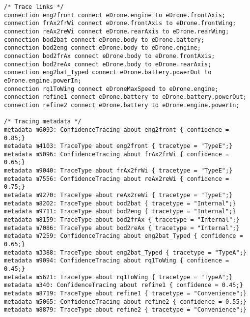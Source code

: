 \begin{center}
\begin{lstlisting}[caption={SysML code generated from a Tracea model.},
label=lst:sysmlout,
style=mystylesysml,
frame=shadowbox,
rulesepcolor=\color{blue},
linewidth=16.6cm,
xleftmargin=0.2cm,
morekeywords={connection,connect,to,metadata,about}]
/* Trace links */
connection eng2front connect eDrone.engine to eDrone.frontAxis;
connection frAx2frWi connect eDrone.frontAxis to eDrone.frontWing;
connection reAx2reWi connect eDrone.rearAxis to eDrone.rearWing;
connection bod2bat connect eDrone.body to eDrone.battery;
connection bod2eng connect eDrone.body to eDrone.engine;
connection bod2frAx connect eDrone.body to eDrone.frontAxis;
connection bod2reAx connect eDrone.body to eDrone.rearAxis;
connection eng2bat_Typed connect eDrone.battery.powerOut to eDrone.engine.powerIn;
connection rq1ToWing connect eDroneMaxSpeed to eDrone.engine;
connection refine1 connect eDrone.battery to eDrone.battery.powerOut;
connection refine2 connect eDrone.battery to eDrone.engine.powerIn;

/* Tracing metadata */
metadata m6093: ConfidenceTracing about eng2front { confidence = 0.85;}
metadata m4103: TraceType about eng2front { tracetype = "TypeE";}
metadata m5096: ConfidenceTracing about frAx2frWi { confidence = 0.65;}
metadata m9040: TraceType about frAx2frWi { tracetype = "TypeE";}
metadata m7556: ConfidenceTracing about reAx2reWi { confidence = 0.75;}
metadata m9270: TraceType about reAx2reWi { tracetype = "TypeE";}
metadata m8202: TraceType about bod2bat { tracetype = "Internal";}
metadata m9711: TraceType about bod2eng { tracetype = "Internal";}
metadata m8159: TraceType about bod2frAx { tracetype = "Internal";}
metadata m7086: TraceType about bod2reAx { tracetype = "Internal";}
metadata m7259: ConfidenceTracing about eng2bat_Typed { confidence = 0.65;}
metadata m3388: TraceType about eng2bat_Typed { tracetype = "TypeA";}
metadata m9094: ConfidenceTracing about rq1ToWing { confidence = 0.45;}
metadata m5621: TraceType about rq1ToWing { tracetype = "TypeA";}
metadata m340: ConfidenceTracing about refine1 { confidence = 0.45;}
metadata m8719: TraceType about refine1 { tracetype = "Convenience";}
metadata m5065: ConfidenceTracing about refine2 { confidence = 0.55;}
metadata m8879: TraceType about refine2 { tracetype = "Convenience";}
\end{lstlisting}
\end{center}